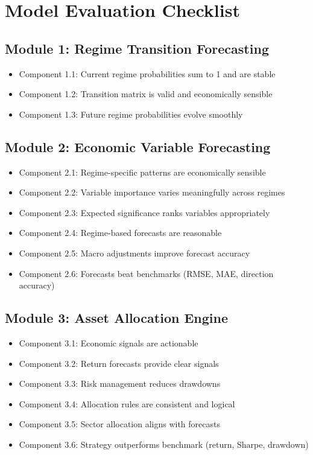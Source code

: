 \documentclass[11pt,a4paper]{article}
\begin{document}
\section{Model Evaluation Checklist}

\subsection{Module 1: Regime Transition Forecasting}
\begin{itemize}
    \item[$\square$] Component 1.1: Current regime probabilities sum to 1 and are stable
    \item[$\square$] Component 1.2: Transition matrix is valid and economically sensible
    \item[$\square$] Component 1.3: Future regime probabilities evolve smoothly
\end{itemize}

\subsection{Module 2: Economic Variable Forecasting}
\begin{itemize}
    \item[$\square$] Component 2.1: Regime-specific patterns are economically sensible
    \item[$\square$] Component 2.2: Variable importance varies meaningfully across regimes
    \item[$\square$] Component 2.3: Expected significance ranks variables appropriately
    \item[$\square$] Component 2.4: Regime-based forecasts are reasonable
    \item[$\square$] Component 2.5: Macro adjustments improve forecast accuracy
    \item[$\square$] Component 2.6: Forecasts beat benchmarks (RMSE, MAE, direction accuracy)
\end{itemize}

\subsection{Module 3: Asset Allocation Engine}
\begin{itemize}
    \item[$\square$] Component 3.1: Economic signals are actionable
    \item[$\square$] Component 3.2: Return forecasts provide clear signals
    \item[$\square$] Component 3.3: Risk management reduces drawdowns
    \item[$\square$] Component 3.4: Allocation rules are consistent and logical
    \item[$\square$] Component 3.5: Sector allocation aligns with forecasts
    \item[$\square$] Component 3.6: Strategy outperforms benchmark (return, Sharpe, drawdown)
\end{itemize}
\end{document}
